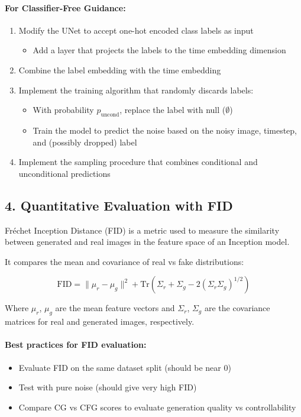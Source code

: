 \paragraph{For Classifier-Free Guidance:}
\begin{enumerate}
    \item Modify the UNet to accept one-hot encoded class labels as input
    \begin{itemize}
        \item Add a layer that projects the labels to the time embedding dimension
    \end{itemize}
    \item Combine the label embedding with the time embedding
    \item Implement the training algorithm that randomly discards labels:
    \begin{itemize}
        \item With probability $p_{\text{uncond}}$, replace the label with null ($\emptyset$)
        \item Train the model to predict the noise based on the noisy image, timestep, and (possibly dropped) label
    \end{itemize}
    \item Implement the sampling procedure that combines conditional and unconditional predictions
\end{enumerate}

\subsection*{4. Quantitative Evaluation with FID}

Fréchet Inception Distance (FID) is a metric used to measure the similarity between generated and real images in the feature space of an Inception model.

It compares the mean and covariance of real vs fake distributions:

\[
\text{FID} = \|\mu_r - \mu_g\|^2 + \text{Tr}(\Sigma_r + \Sigma_g - 2(\Sigma_r \Sigma_g)^{1/2})
\]

Where $\mu_r$, $\mu_g$ are the mean feature vectors and $\Sigma_r$, $\Sigma_g$ are the covariance matrices for real and generated images, respectively.

\paragraph{Best practices for FID evaluation:}
\begin{itemize}
    \item Evaluate FID on the same dataset split (should be near 0)
    \item Test with pure noise (should give very high FID)
    \item Compare CG vs CFG scores to evaluate generation quality vs controllability
\end{itemize}


